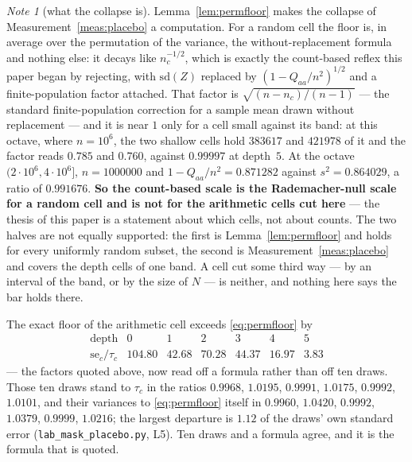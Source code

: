 \documentclass[11pt,a4paper]{article}
\theoremstyle{plain}
\theoremstyle{definition}
\theoremstyle{remark}
\newtheorem{note}[theorem]{Note}
\begin{document}
\begin{note}[what the collapse is]\label{note:collapse}
Lemma~\ref{lem:permfloor} makes the collapse of
Measurement~\ref{meas:placebo} a computation. For a random cell the
floor is, in average over the permutation of the variance, the
without-replacement
formula and nothing else: it decays like $n_c^{-1/2}$, which is exactly the count-based reflex this paper
began by rejecting, with $\mathrm{sd}(Z)$ replaced by
$(1-Q_{aa}/n^2)^{1/2}$ and a finite-population factor attached. That
factor is $\sqrt{(n-n_c)/(n-1)}$ --- the standard finite-population
correction for a sample mean drawn without replacement
\cite{Cochran} --- and it is near $1$ only for a cell
small against its band: at this octave, where $n=10^6$, the two
shallow cells hold $383617$ and $421978$ of it and the factor reads
$0.785$ and $0.760$, against $0.99997$ at depth~$5$. At the
octave $(2\cdot10^6,4\cdot10^6]$, $n=1000000$ and
$1-Q_{aa}/n^2=0.871282$ against $s^2=0.864029$, a ratio of
$0.991676$. \textbf{So the count-based scale is the Rademacher-null
scale for a random cell and is not for the arithmetic cells cut here}
--- the thesis of this paper is a statement about which cells, not
about counts. The
two halves are not equally supported: the first is
Lemma~\ref{lem:permfloor} and holds for every uniformly random subset,
the second is Measurement~\ref{meas:placebo} and covers the depth cells
of one band. A cell cut some third way --- by an interval of the band,
or by the size of $N$ --- is neither, and nothing here says the bar
holds there.

The exact floor of the arithmetic cell exceeds \eqref{eq:permfloor} by
\[
\begin{array}{r|cccccc}
 \text{depth} & 0 & 1 & 2 & 3 & 4 & 5\\\hline
 \mathrm{se}_c\big/\tau_c
   & 104.80 & 42.68 & 70.28 & 44.37 & 16.97 & 3.83
\end{array}
\]
--- the factors quoted above, now read off a formula rather than off
ten draws. Those ten draws stand to $\tau_c$ in
the ratios $0.9968$, $1.0195$, $0.9991$, $1.0175$, $0.9992$,
$1.0101$, and their variances to \eqref{eq:permfloor} itself in
$0.9960$, $1.0420$, $0.9992$, $1.0379$, $0.9999$, $1.0216$; the
largest departure is $1.12$ of the draws' own standard error
(\texttt{lab\_mask\_placebo.py}, L5). Ten draws and a formula agree,
and it is the formula that is quoted.
\end{note}
\end{document}
